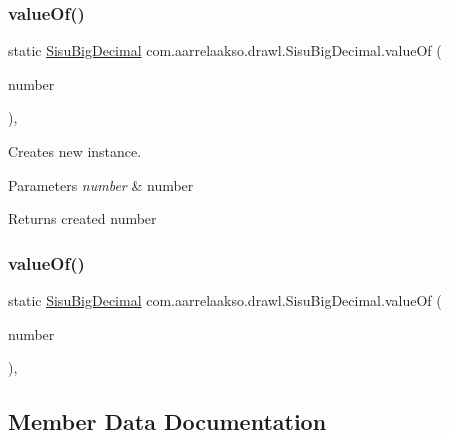 \subsubsection{\texorpdfstring{value\+Of()}{valueOf()}\hspace{0.1cm}{\footnotesize\ttfamily [3/4]}}
{\footnotesize\ttfamily static \hyperlink{classcom_1_1aarrelaakso_1_1drawl_1_1_sisu_big_decimal}{Sisu\+Big\+Decimal} com.\+aarrelaakso.\+drawl.\+Sisu\+Big\+Decimal.\+value\+Of (\begin{DoxyParamCaption}\item[{Big\+Decimal}]{number }\end{DoxyParamCaption})\hspace{0.3cm}{\ttfamily [static]}, {\ttfamily [protected]}}

Creates new instance.


\begin{DoxyParams}{Parameters}
{\em number} & number \\
\hline
\end{DoxyParams}
\begin{DoxyReturn}{Returns}
created number 
\end{DoxyReturn}
\mbox{\label{classcom_1_1aarrelaakso_1_1drawl_1_1_sisu_big_decimal_a9dbb81d513bd251ef0c20696b272ddc3}} 
\subsubsection{\texorpdfstring{value\+Of()}{valueOf()}\hspace{0.1cm}{\footnotesize\ttfamily [4/4]}}
{\footnotesize\ttfamily static \hyperlink{classcom_1_1aarrelaakso_1_1drawl_1_1_sisu_big_decimal}{Sisu\+Big\+Decimal} com.\+aarrelaakso.\+drawl.\+Sisu\+Big\+Decimal.\+value\+Of (\begin{DoxyParamCaption}\item[{Integer}]{number }\end{DoxyParamCaption})\hspace{0.3cm}{\ttfamily [static]}, {\ttfamily [protected]}}



\subsection{Member Data Documentation}
\mbox{\label{classcom_1_1aarrelaakso_1_1drawl_1_1_sisu_big_decimal_ae01ee6ac57cabf393e59465704a62f2c}} 
